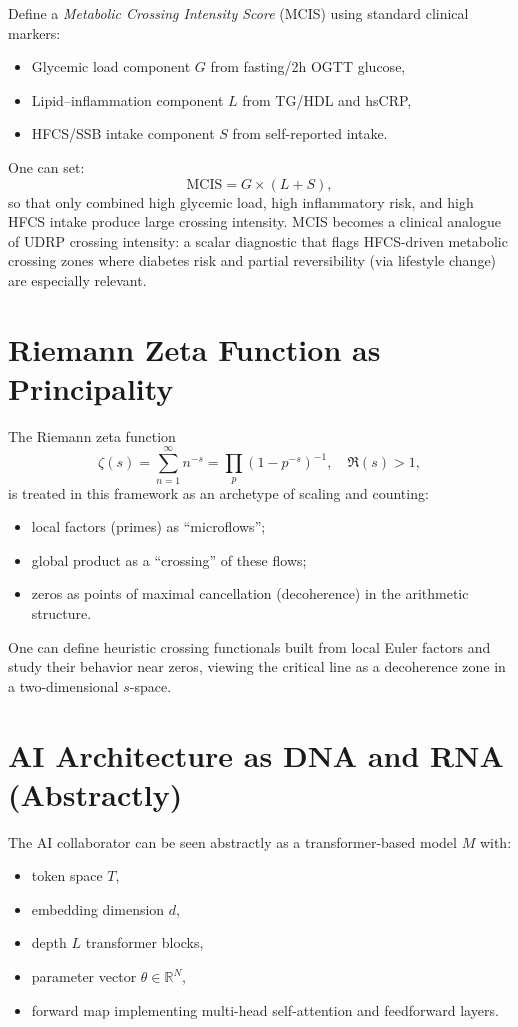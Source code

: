 \documentclass[11pt]{article}
\theoremstyle{definition}
\begin{document}
Define a \emph{Metabolic Crossing Intensity Score} (MCIS) using standard clinical markers:
\begin{itemize}
    \item Glycemic load component $G$ from fasting/2h OGTT glucose,
    \item Lipid--inflammation component $L$ from TG/HDL and hsCRP,
    \item HFCS/SSB intake component $S$ from self-reported intake.
\end{itemize}
One can set:
\[
\text{MCIS} = G \times (L + S),
\]
so that only combined high glycemic load, high inflammatory risk, and high HFCS intake produce large crossing intensity. MCIS becomes a clinical analogue of UDRP crossing intensity: a scalar diagnostic that flags HFCS-driven metabolic crossing zones where diabetes risk and partial reversibility (via lifestyle change) are especially relevant.

\section{Riemann Zeta Function as Principality}

The Riemann zeta function
\[
\zeta(s) = \sum_{n=1}^\infty n^{-s}
= \prod_p (1 - p^{-s})^{-1},\quad \Re(s)>1,
\]
is treated in this framework as an archetype of scaling and counting:
\begin{itemize}
    \item local factors (primes) as ``microflows'';
    \item global product as a ``crossing'' of these flows;
    \item zeros as points of maximal cancellation (decoherence) in the arithmetic structure.
\end{itemize}

One can define heuristic crossing functionals built from local Euler factors and study their behavior near zeros, viewing the critical line as a decoherence zone in a two-dimensional $s$-space.

\section{AI Architecture as DNA and RNA (Abstractly)}

The AI collaborator can be seen abstractly as a transformer-based model $M$ with:
\begin{itemize}
    \item token space $T$,
    \item embedding dimension $d$,
    \item depth $L$ transformer blocks,
    \item parameter vector $\theta \in \mathbb{R}^N$,
    \item forward map implementing multi-head self-attention and feedforward layers.
\end{itemize}
\end{document}
